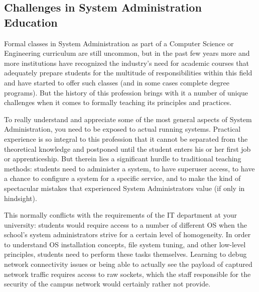 \subsection{Challenges in System Administration Education}
\label{introduction:education:challenges}

Formal classes in System Administration as part of a
Computer Science or Engineering curriculum are still
uncommon, but in the past few years more and more
institutions have recognized the industry's need for
academic courses that adequately prepare students for
the multitude of responsibilities within this field
and have started to offer such classes (and in some
cases complete degree programs).  But the history of
this profession brings with it a number of unique
challenges when it comes to formally teaching its
principles and practices.

To really understand and appreciate some of the most
general aspects of System Administration, you need to
be exposed to actual running systems.  Practical
experience is so integral to this profession that it
cannot be separated from the theoretical knowledge and
postponed until the student enters his or her first
job or apprenticeship.  But therein lies a significant
hurdle to traditional teaching methods: students need
to administer a system, to have superuser access, to
have a chance to configure a system for a specific
service, and to make the kind of spectacular mistakes
that experienced System Administrators value (if only
in hindsight).

This normally conflicts with the requirements of the
IT department at your university: students would
require access to a number of different OS when the
school's system administrators strive for a certain
level of homogeneity. In order to understand OS
installation concepts, file system tuning, and other
low-level principles, students need to perform these
tasks themselves. Learning to debug network
connectivity issues or being able to actually see the
payload of captured network traffic requires access to
raw sockets, which the staff responsible for the
security of the campus network would certainly rather
not provide.

